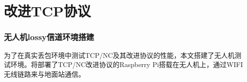 \chapter{改进TCP协议}
\subsection{无人机lossy信道环境搭建}
为了在真实丢包环境中测试TCP/NC及其改进协议的性能，本文搭建了无人机测试环境。将部署了TCP/NC改进协议的Raspberry Pi搭载在无人机上，通过WIFI无线链路来与地面站通信。 